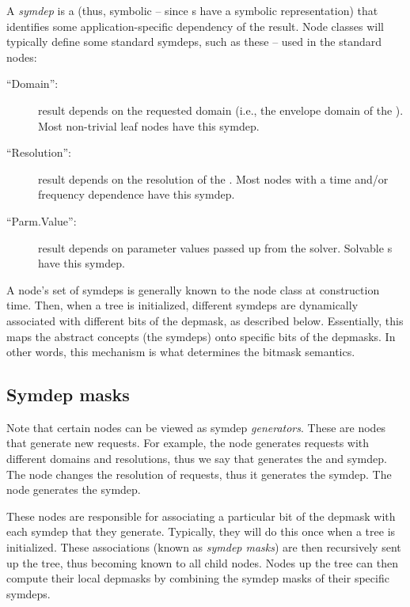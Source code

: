 \documentclass[10pt,twoside]{book}
\begin{document}
  A {\em symdep} is a  (thus, symbolic -- since s have a
  symbolic representation) that identifies some application-specific dependency
  of the result. Node classes will typically define some standard symdeps, such
  as these -- used in the standard nodes:

  \begin{description}
  
  \item[``Domain'':] result depends on the requested domain (i.e., the envelope
    domain of the \Cells). Most non-trivial leaf nodes have this symdep.

  \item[``Resolution'':] result depends on the resolution of the \Cells. Most
    nodes with a time and/or frequency dependence have this symdep.
   
  \item[``Parm.Value'':] result depends on parameter values passed up from the
    solver. Solvable \Parm{}s have this symdep.
  
  \end{description}
  
  A node's set of symdeps is generally known to the node class at construction
  time. Then, when a tree is initialized, different symdeps are dynamically
  associated with different bits of the depmask, as described below.
  Essentially, this maps the abstract concepts (the symdeps) onto specific bits
  of the depmasks. In other words, this mechanism is what determines the
  bitmask semantics.

\subsection{Symdep masks}

  Note that certain nodes can be viewed as symdep {\em generators}. These are
  nodes that generate new requests. For example, the  node generates
  requests with different domains and resolutions, thus we say that 
  generates the  and  symdep. The  node
  changes the resolution of requests, thus it generates the 
  symdep. The  node generates the  symdep.
  
  These nodes are responsible for associating a particular bit of the depmask
  with each symdep that they generate. Typically, they will do this once when a
  tree is initialized. These associations (known as {\em symdep masks}) are
  then recursively sent up the tree, thus becoming known to all child nodes.
  Nodes up the tree can then compute their local depmasks by combining the
  symdep masks of their specific symdeps.
\end{document}
